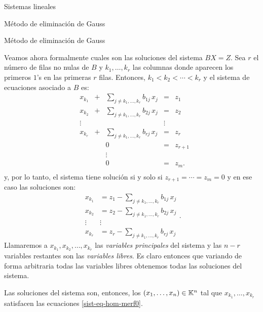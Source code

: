 \begin{chapter}{Sistemas lineales}
\begin{section}{Método de eliminación de Gauss }
\begin{subsection}{Método de eliminación de Gauss}
                
                Veamos ahora formalmente cuales son las soluciones del sistema $BX=Z$. Sea $r$ el número de filas no nulas de $B$ y $k_1,\ldots, k_r$ las columnas donde aparecen los primeros $1$'s en las primeras $r$ filas. Entonces, $k_1 < k_2 < \cdots< k_r$ y el sistema de ecuaciones asociado a $B$ es:
                \begin{equation}
                \begin{matrix}
                &x_{k_1}& + &\sum_{j \not= k_1,\ldots, k_r} b_{1j}\,x_j&= &z_1\\
                &x_{k_2}& + &\sum_{j \not= k_1,\ldots, k_r} b_{2j}\,x_j&= &z_2\\
                & \vdots& &  &\vdots \\
                &x_{k_r}& + &\sum_{j \not= k_1,\ldots, k_r} b_{rj}\,x_j&= &z_r\\
                &&  &0&= &z_{r+1}\\
                &&  &\vdots &\\
                &&  &0&= &z_{m}.\\
                \end{matrix}
                \end{equation}  
                y, por lo tanto, el sistema tiene solución si y solo si  $z_{r+1} = \cdots = z_m =0$ y en ese caso las soluciones son: 
                \begin{equation}
                \begin{matrix}\label{sist-eq-hom-merf0}
                x_{k_1} &= z_1-\sum_{j \not= k_1,\ldots, k_r} b_{1j}\,x_j\\
                x_{k_2} &= z_2-\sum_{j \not= k_1,\ldots, k_r} b_{2j}\,x_j\\
                \vdots& \vdots \\
                x_{k_r}  &= z_r-\textstyle\sum_{j \not= k_1,\ldots, k_r} b_{rj}\,x_j
                \end{matrix}.
                \end{equation} 
                Llamaremos a  $x_{k_1}, x_{k_2}, \ldots, x_{k_r}$ las \textit{variables principales} del sistema  y  las $n-r$ variables restantes son las \textit{variables libres}. Es claro entonces que variando de forma arbitraria todas las variables libres obtenemos todas las soluciones del sistema.
                
                 Las soluciones del sistema son, entonces,  los $(x_1,\ldots,x_n)\in \mathbb K^n$ tal que $x_{k_1},\ldots,x_{k_r}$ satisfacen las ecuaciones \eqref{sist-eq-hom-merf0}.
            

\end{subsection}
\end{section}
\end{chapter}
